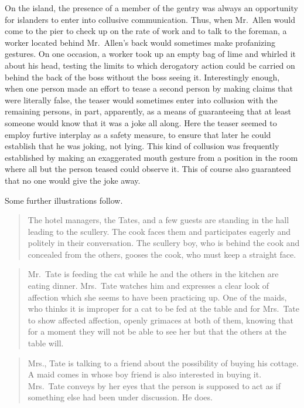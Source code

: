 \documentclass[twoside,symmetric,nobib,justified]{tufte-book}
\begin{document}
On the island, the presence of a member of the gentry was always an
opportunity for islanders to enter into collusive communication. Thus,
when Mr.~Allen would come to the pier to check up on the rate of work
and to talk to the foreman, a worker located behind Mr.~Allen's back
would sometimes make profanizing gestures. On one occasion, a worker
took up an empty bag of lime and whirled it about his head, testing the
limits to which derogatory action could be carried on behind the back of
the boss without the boss seeing it. Interestingly enough, when one
person made an effort to tease a second person by making claims that
were literally false, the teaser would sometimes enter into collusion
with the remaining persons, in part, apparently, as a means of
guaranteeing that at least someone would know that it was a joke all
along. Here the teaser seemed to employ furtive interplay as a safety
measure, to ensure that later he could establish that he was joking, not
lying. This kind of collusion was frequently established by making an
exaggerated mouth gesture from a position in the room where all but the
person teased could observe it. This of course also guaranteed that no
one would give the joke away.

Some further illustrations follow.

\begin{quote}
The hotel managers, the Tates, and a few guests are standing in the hall
leading to the scullery. The cook faces them and participates eagerly
and politely in their conversation. The scullery boy, who is behind the
cook and concealed from the others, gooses the cook, who must keep a
straight face.
\end{quote}

\begin{quote}
Mr.~Tate is feeding the cat while he and the others in the kitchen are
eating dinner. Mrs.~Tate watches him and expresses a clear look of
affection which she seems to have been practicing up. One of the maids,
who thinks it is improper for a cat to be fed at the table and for
Mrs.~Tate to show affected affection, openly grimaces at both of them,
knowing that for a moment they will not be able to see her but that the
others at the table will.
\end{quote}

\begin{quote}
Mrs., Tate is talking to a friend about the possibility of buying his
cottage. A maid comes in whose boy friend is also interested in buying
it. Mrs.~Tate conveys by her eyes that the person is supposed to act as
if something else had been under discussion. He does.
\end{quote}
\end{document}
